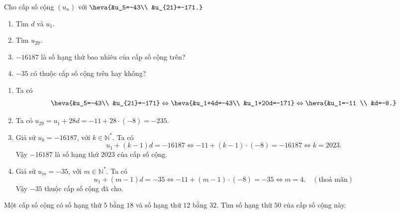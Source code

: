 \begin{bt}%
	Cho cấp số cộng $(u_n)$ với $\heva{&u_5=-43\\ &u_{21}=-171.}$
	\begin{enumerate}
		\item Tìm $d$ và $u_1$.
		\item Tìm $u_{29}$.
		\item $-16187$ là số hạng thứ bao nhiêu của cấp số cộng trên?
		\item $-35$ có thuộc cấp số cộng trên hay không?		
	\end{enumerate}
	\loigiai
	{
		\begin{enumerate}
			\item Ta có
			\begin{eqnarray*}
				\heva{&u_5=-43\\ &u_{21}=-171} \Leftrightarrow \heva{&u_1+4d=-43\\ &u_1+20d=-171} \Leftrightarrow \heva{&u_1=-11 \\ &d=-8.}
			\end{eqnarray*}
			\item Ta có $u_{29}= u_1+28d= -11+28 \cdot (-8)= -235$.
			\item Giả sử $u_k= -16187$, với $k \in \mathbb{N}^*$. Ta có
			\[
			u_1+ (k-1)d= -16187 \Leftrightarrow -11 + (k-1) \cdot (-8)= -16187 \Leftrightarrow k= 2023.
			\]
			Vậy $-16187$ là số hạng thứ $2023$ của cấp số cộng.
			\item Giả sử $u_m= -35$, với $m\in \mathbb{N}^*$. Ta có
			\[
			u_1+ (m-1) d= -35 \Leftrightarrow -11+ (m-1) \cdot (-8)= -35 \Leftrightarrow m=4. \quad (\text{thoả mãn})
			\]
			Vậy $-35$ thuộc cấp số cộng đã cho.
		\end{enumerate}
	}
\end{bt}

\begin{bt}%

	Một cấp số cộng có số hạng thứ $5$ bằng $18$ và số hạng thứ $12$ bằng $32$. Tìm số hạng thứ $50$ của cấp số cộng này.
\end{bt}


